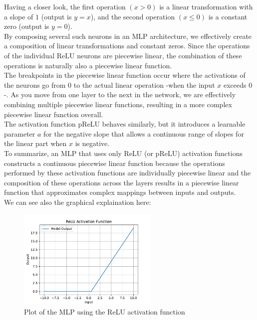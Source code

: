 Having a closer look, the first operation $(x > 0)$ is a linear transformation with a slope of $1$ (output is $y = x$), and the second operation $(x \leq 0)$ is a constant zero (output is $y = 0$).\\

By composing several such neurons in an MLP architecture, we effectively create a composition of linear transformations and constant zeros. Since the operations of the individual ReLU neurons are piecewise linear, the combination of these operations is naturally also a piecewise linear function.\\
The breakpoints in the piecewise linear function occur where the activations of the neurons go from $0$ to the actual linear operation -when the input $x$ exceeds $0$ -. As you move from one layer to the next in the network, we are effectively combining multiple piecewise linear functions, resulting in a more complex piecewise linear function overall.\\

The activation function pReLU behaves similarly, but it introduces a learnable parameter $a$ for the negative slope that allows a continuous range of slopes for the linear part when $x$ is negative.\\

To summarize, an MLP that uses only ReLU (or pReLU) activation functions constructs a continuous piecewise linear function because the operations performed by these activation functions are individually piecewise linear and the composition of these operations across the layers results in a piecewise linear function that approximates complex mappings between inputs and outputs.\\

We can see also the graphical explaination  here:
\begin{figure}[h]
	\centering
	\includegraphics[width=0.6\textwidth]{../Problem 7/MLP_ReLU_plot.pdf}
	\caption{Plot of the MLP using the ReLU activation function}
\end{figure}
\vspace{5mm}


 

